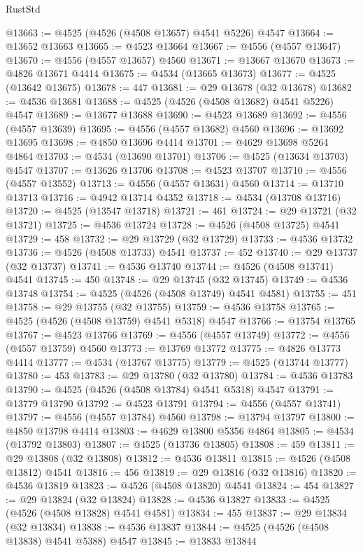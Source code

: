 \begin{lexlean}{RustStd}
\begin{coremodule}
{\begin{coremodule}
{{{{{{{{{{{{{{{{{{{{{{{{{{{{{{{{{{{{{{{{{{{{{{{{{{{{{{{@13663 := @4525 (@4526 (@4508 @13657) @4541 @5226) @4547
@13664 := @13652 @13663
@13665 := @4523 @13664
@13667 := @4556 (@4557 @13647)
@13670 := @4556 (@4557 @13657) @4560
@13671 := @13667 @13670
@13673 := @4826 @13671 @4414
@13675 := @4534 (@13665 @13673)
@13677 := @4525 (@13642 @13675)
@13678 := 447
@13681 := @29 @13678 (@32 @13678)
@13682 := @4536 @13681
@13688 := @4525 (@4526 (@4508 @13682) @4541 @5226) @4547
@13689 := @13677 @13688
@13690 := @4523 @13689
@13692 := @4556 (@4557 @13639)
@13695 := @4556 (@4557 @13682) @4560
@13696 := @13692 @13695
@13698 := @4850 @13696 @4414
@13701 := @4629 @13698 @5264 @4864
@13703 := @4534 (@13690 @13701)
@13706 := @4525 (@13634 @13703) @4547
@13707 := @13626 @13706
@13708 := @4523 @13707
@13710 := @4556 (@4557 @13552)
@13713 := @4556 (@4557 @13631) @4560
@13714 := @13710 @13713
@13716 := @4942 @13714 @4352
@13718 := @4534 (@13708 @13716)
@13720 := @4525 (@13547 @13718)
@13721 := 461
@13724 := @29 @13721 (@32 @13721)
@13725 := @4536 @13724
@13728 := @4526 (@4508 @13725) @4541
@13729 := 458
@13732 := @29 @13729 (@32 @13729)
@13733 := @4536 @13732
@13736 := @4526 (@4508 @13733) @4541
@13737 := 452
@13740 := @29 @13737 (@32 @13737)
@13741 := @4536 @13740
@13744 := @4526 (@4508 @13741) @4541
@13745 := 450
@13748 := @29 @13745 (@32 @13745)
@13749 := @4536 @13748
@13754 := @4525 (@4526 (@4508 @13749) @4541 @4581)
@13755 := 451
@13758 := @29 @13755 (@32 @13755)
@13759 := @4536 @13758
@13765 := @4525 (@4526 (@4508 @13759) @4541 @5318) @4547
@13766 := @13754 @13765
@13767 := @4523 @13766
@13769 := @4556 (@4557 @13749)
@13772 := @4556 (@4557 @13759) @4560
@13773 := @13769 @13772
@13775 := @4826 @13773 @4414
@13777 := @4534 (@13767 @13775)
@13779 := @4525 (@13744 @13777)
@13780 := 453
@13783 := @29 @13780 (@32 @13780)
@13784 := @4536 @13783
@13790 := @4525 (@4526 (@4508 @13784) @4541 @5318) @4547
@13791 := @13779 @13790
@13792 := @4523 @13791
@13794 := @4556 (@4557 @13741)
@13797 := @4556 (@4557 @13784) @4560
@13798 := @13794 @13797
@13800 := @4850 @13798 @4414
@13803 := @4629 @13800 @5356 @4864
@13805 := @4534 (@13792 @13803)
@13807 := @4525 (@13736 @13805)
@13808 := 459
@13811 := @29 @13808 (@32 @13808)
@13812 := @4536 @13811
@13815 := @4526 (@4508 @13812) @4541
@13816 := 456
@13819 := @29 @13816 (@32 @13816)
@13820 := @4536 @13819
@13823 := @4526 (@4508 @13820) @4541
@13824 := 454
@13827 := @29 @13824 (@32 @13824)
@13828 := @4536 @13827
@13833 := @4525 (@4526 (@4508 @13828) @4541 @4581)
@13834 := 455
@13837 := @29 @13834 (@32 @13834)
@13838 := @4536 @13837
@13844 := @4525 (@4526 (@4508 @13838) @4541 @5388) @4547
@13845 := @13833 @13844
}}}}}}}}}}}}}}}}}}}}}}}}}}}}}}}}}}}}}}}}}}}}}}}}}}}}}}}
\end{coremodule}}
\end{coremodule}
\end{lexlean}

